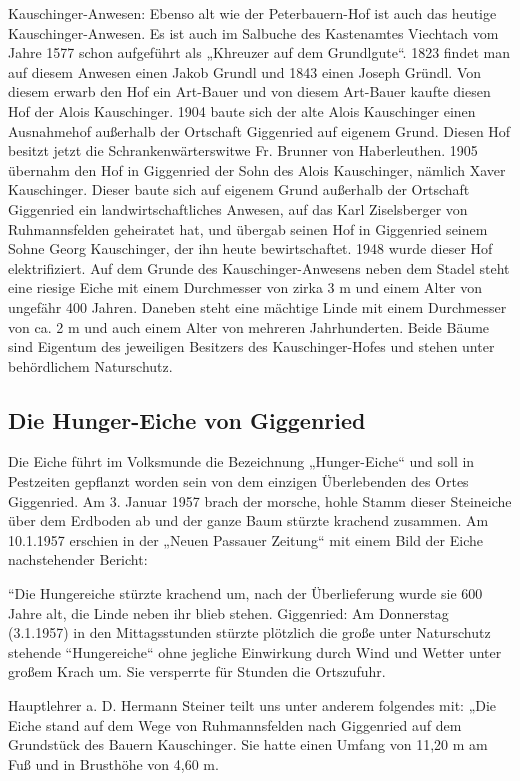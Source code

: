 \documentclass[12pt,a4pager]{book}
\begin{document}
Kauschinger-Anwesen: Ebenso alt wie der Peterbauern-Hof ist auch das heutige
Kauschinger-Anwesen. Es ist auch im Salbuche des Kastenamtes Viechtach vom Jahre
1577 schon aufgeführt als „Khreuzer auf dem Grundlgute“. 1823 findet man auf
diesem Anwesen einen Jakob Grundl und 1843 einen Joseph Gründl. Von diesem
erwarb den Hof ein Art-Bauer und von diesem Art-Bauer kaufte diesen Hof der
Alois Kauschinger. 1904 baute sich der alte Alois Kauschinger einen Ausnahmehof
außerhalb der Ortschaft Giggenried auf eigenem Grund. Diesen Hof besitzt jetzt
die Schrankenwärterswitwe Fr. Brunner von Haberleuthen. 1905 übernahm den Hof in
Giggenried der Sohn des Alois Kauschinger, nämlich Xaver Kauschinger. Dieser
baute sich auf eigenem Grund außerhalb der Ortschaft Giggenried ein
landwirtschaftliches Anwesen, auf das Karl Ziselsberger von Ruhmannsfelden
geheiratet hat, und übergab seinen Hof in Giggenried seinem Sohne Georg
Kauschinger, der ihn heute bewirtschaftet. 1948 wurde dieser Hof elektrifiziert.
Auf dem Grunde des Kauschinger-Anwesens neben dem Stadel steht eine riesige
Eiche mit einem Durchmesser von zirka 3 m und einem Alter von ungefähr 400
Jahren. Daneben steht eine mächtige Linde mit einem Durchmesser von ca. 2 m und
auch einem Alter von mehreren Jahrhunderten. Beide Bäume sind Eigentum des
jeweiligen Besitzers des Kauschinger-Hofes und stehen unter behördlichem
Naturschutz.

\subsection{Die Hunger-Eiche von Giggenried}

Die Eiche führt im Volksmunde die Bezeichnung „Hunger-Eiche“ und soll in
Pestzeiten gepflanzt worden sein von dem einzigen Überlebenden des Ortes
Giggenried. Am 3. Januar 1957 brach der morsche, hohle Stamm dieser Steineiche
über dem Erdboden ab und der ganze Baum stürzte krachend zusammen. Am 10.1.1957
erschien in der „Neuen Passauer Zeitung“ mit einem Bild der Eiche nachstehender
Bericht:

“Die Hungereiche stürzte krachend um, nach der Überlieferung wurde sie 600 Jahre
alt, die Linde neben ihr blieb stehen. Giggenried: Am Donnerstag (3.1.1957) in
den Mittagsstunden stürzte plötzlich die große unter Naturschutz stehende
“Hungereiche“ ohne jegliche Einwirkung durch Wind und Wetter unter großem Krach
um. Sie versperrte für Stunden die Ortszufuhr.

Hauptlehrer a. D. Hermann Steiner teilt uns unter anderem folgendes mit: „Die
Eiche stand auf dem Wege von Ruhmannsfelden nach Giggenried auf dem Grundstück
des Bauern Kauschinger. Sie hatte einen Umfang von 11,20 m am Fuß und in
Brusthöhe von 4,60 m.
\end{document}
